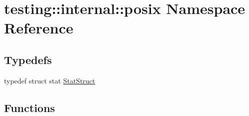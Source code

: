 \hypertarget{namespacetesting_1_1internal_1_1posix}{}\section{testing\+::internal\+::posix Namespace Reference}
\label{namespacetesting_1_1internal_1_1posix}
\subsection*{Typedefs}
\begin{DoxyCompactItemize}
\item 
typedef struct stat \mbox{\hyperlink{namespacetesting_1_1internal_1_1posix_a8eb9f08d3af29941c2d2a964cfff3ecb}{Stat\+Struct}}
\end{DoxyCompactItemize}
\subsection*{Functions}
